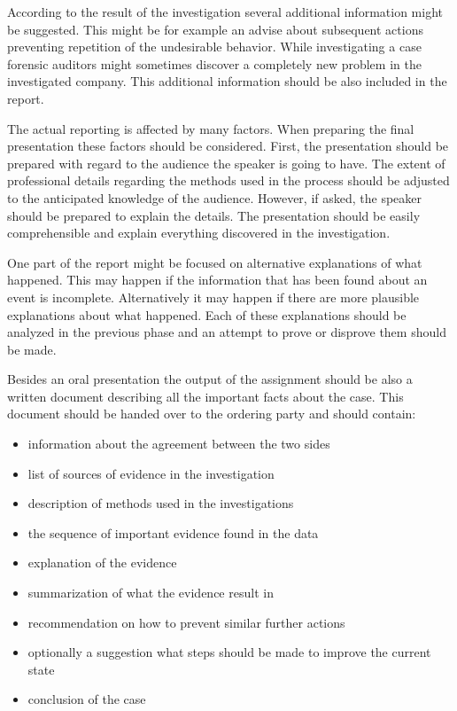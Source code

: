 According to the result of the investigation several additional information might be suggested. This might be for example an advise about subsequent actions preventing repetition of the undesirable behavior. While investigating a case forensic auditors might sometimes discover a completely new problem in the investigated company. This additional information should be also included in the report. 

The actual reporting is affected by many factors. When preparing the final presentation these factors should be considered. First, the presentation should be prepared with regard to the audience the speaker is going to have. The extent of professional details regarding the methods used in the process should be adjusted to the anticipated knowledge of the audience. However, if asked, the speaker should be prepared to explain the details. The presentation should be easily comprehensible and explain everything discovered in the investigation. 

One part of the report might be focused on alternative explanations of what happened. This may happen if the information that has been found about an event is incomplete. Alternatively it may happen if there are more plausible explanations about what happened. Each of these explanations should be analyzed in the previous phase and an attempt to prove or disprove them should be made.


Besides an oral presentation the output of the assignment should be also a written document describing all the important facts about the case. This document should be handed over to the ordering party and should contain:
\begin{itemize}
\item information about the agreement between the two sides
\item list of sources of evidence in the investigation
\item description of methods used in the investigations
\item the sequence of important evidence found in the data 
\item explanation of the evidence
\item summarization of what the evidence result in
\item recommendation on how to prevent similar further actions
\item optionally a suggestion what steps should be made to improve the current state
\item conclusion of the case
\end {itemize}


